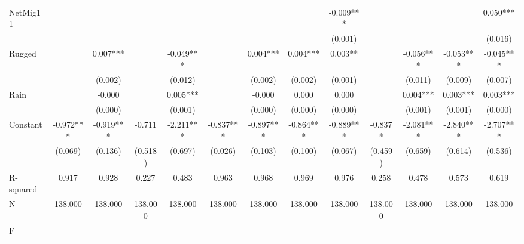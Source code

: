 {\begin{tabular}{l*{12}{c}}
NetMig11            &               &               &               &               &               &               &               &      -0.009***&               &               &               &       0.050***\\
                    &               &               &               &               &               &               &               &     (0.001)   &               &               &               &     (0.016)   \\
Rugged              &               &       0.007***&               &      -0.049***&               &       0.004***&       0.004***&       0.003** &               &      -0.056***&      -0.053***&      -0.045***\\
                    &               &     (0.002)   &               &     (0.012)   &               &     (0.002)   &     (0.002)   &     (0.001)   &               &     (0.011)   &     (0.009)   &     (0.007)   \\
Rain                &               &      -0.000   &               &       0.005***&               &      -0.000   &       0.000   &       0.000   &               &       0.004***&       0.003***&       0.003***\\
                    &               &     (0.000)   &               &     (0.001)   &               &     (0.000)   &     (0.000)   &     (0.000)   &               &     (0.001)   &     (0.001)   &     (0.000)   \\
Constant            &      -0.972***&      -0.919***&      -0.711   &      -2.211***&      -0.837***&      -0.897***&      -0.864***&      -0.889***&      -0.837*  &      -2.081***&      -2.840***&      -2.707***\\
                    &     (0.069)   &     (0.136)   &     (0.518)   &     (0.697)   &     (0.026)   &     (0.103)   &     (0.100)   &     (0.067)   &     (0.459)   &     (0.659)   &     (0.614)   &     (0.536)   \\
\hline
R-squared           &       0.917   &       0.928   &       0.227   &       0.483   &       0.963   &       0.968   &       0.969   &       0.976   &       0.258   &       0.478   &       0.573   &       0.619   \\
N                   &     138.000   &     138.000   &     138.000   &     138.000   &     138.000   &     138.000   &     138.000   &     138.000   &     138.000   &     138.000   &     138.000   &     138.000   \\
F                   &               &               &               &               &               &               &               &               &               &               &               &               \\
\hline\hline
\end{tabular}
}
